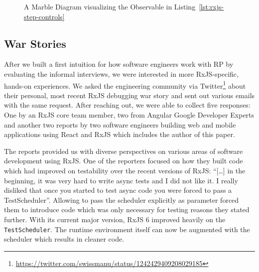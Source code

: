\documentclass[12pt,a4paper]{article}
\begin{document}
\begin{figure}[H]
	\centering
	
	\caption{A Marble Diagram visualizing the Observable in Listing~\ref{lst:rxjs-step-controls}}
	\label{fig:marble-diagram}
\end{figure}

\subsection{War Stories}

After we built a first intuition for how software engineers work with RP by evaluating the informal interviews, we were interested in more RxJS-specific, hands-on experiences. We asked the engineering community via Twitter\footnote{\url{https://twitter.com/swissmanu/status/1242429409208029185}} about their personal, most recent RxJS debugging war story and sent out various emails with the same request. After reaching out, we were able to collect five responses: One by an RxJS core team member, two from Angular Google Developer Experts and another two reports by two software engineers building web and mobile applications using React and RxJS which includes the author of this paper.

The reports provided us with diverse perspectives on various areas of software development using RxJS. One of the reporters focused on how they built code which had improved on testability over the recent versions of RxJS: ``[\dots] in the beginning, it was very hard to write async tests and I did not like it. I really disliked that once you started to test async code you were forced to pass a TestScheduler''. Allowing to pass the scheduler explicitly as parameter forced them to introduce code which was only necessary for testing reasons they stated further. With its current major version, RxJS 6 improved heavily on the  \texttt{TestScheduler}. The runtime environment itself can now be augmented with the scheduler which results in cleaner code.
\end{document}
